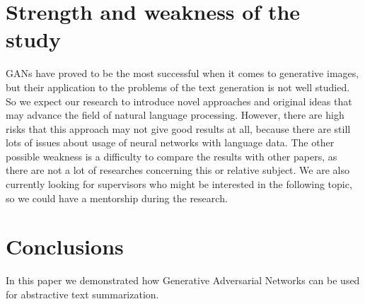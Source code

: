 \documentclass[sigplan]{acmart}
\begin{document}

\section{Strength and weakness of the study}
GANs have proved to be the most successful when it comes to generative images, but their application to the problems of the text generation is not well studied. So we expect our research to introduce novel approaches and original ideas that may advance the field of natural language processing.
However, there are high risks that this approach may not give good results at all, because there are still lots of issues about  usage of neural networks with language data. The other possible weakness is a difficulty to compare the results with other papers, as there are not a lot of researches concerning this or relative subject. 
We are also currently looking for supervisors who might be interested in the following topic, so we could have a mentorship during the research.

\section*{Conclusions}

In this paper we demonstrated how Generative Adversarial Networks can be used for abstractive text summarization.



\end{document}
